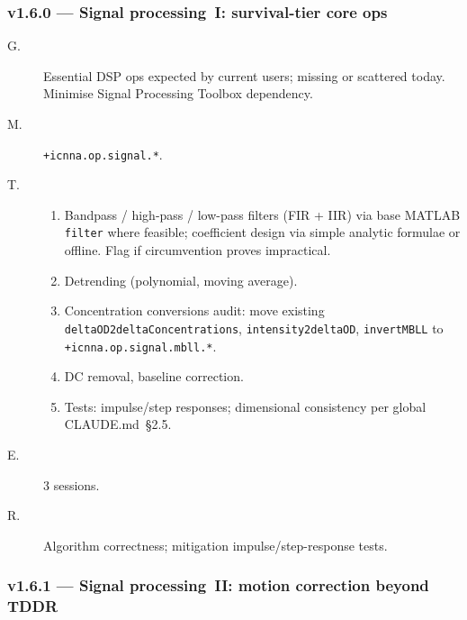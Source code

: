 \documentclass[11pt,a4paper]{article}
\begin{document}
\subsubsection*{v1.6.0 --- Signal processing~I: survival-tier core ops}

\begin{description}
    \item[G.] Essential DSP ops expected by current users; missing or scattered today. Minimise Signal Processing Toolbox dependency.
    \item[M.] \texttt{+icnna.op.signal.*}.
    \item[T.]
        \begin{enumerate}[nosep]
            \item Bandpass / high-pass / low-pass filters (FIR + IIR) via base MATLAB \texttt{filter} where feasible; coefficient design via simple analytic formulae or offline. Flag if circumvention proves impractical.
            \item Detrending (polynomial, moving average).
            \item Concentration conversions audit: move existing \texttt{deltaOD2deltaConcentrations}, \texttt{intensity2deltaOD}, \texttt{invertMBLL} to \texttt{+icnna.op.signal.mbll.*}.
            \item DC removal, baseline correction.
            \item Tests: impulse/step responses; dimensional consistency per global CLAUDE.md~\S 2.5.
        \end{enumerate}
    \item[E.] 3 sessions.
    \item[R.] Algorithm correctness; mitigation impulse/step-response tests.
\end{description}

\subsubsection*{v1.6.1 --- Signal processing~II: motion correction beyond TDDR}
\end{document}
